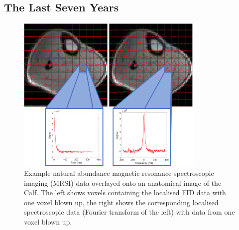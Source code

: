 \documentclass[class=article, crop=false]{standalone}
\begin{document}
\subsection{The Last Seven Years}

\begin{figure}[H]
    \centering
    \includegraphics[width=0.8\textwidth]{Figures/Intro/CSI.png}
    \caption{Example natural abundance magnetic resonance spectroscopic imaging (MRSI) data overlayed onto an anatomical image of the Calf. The left shows voxels containing the localised FID data with one voxel blown up, the right shows the corresponding localised spectroscopic data (Fourier transform of the left) with data from one voxel blown up.}
    \label{fig:intro:CSI}
\end{figure}
\end{document}
